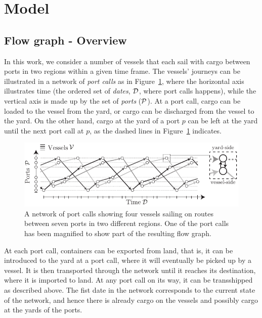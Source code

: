 \section{Model}
\subsection{Flow graph - Overview}

In this work, we consider a number of vessels that each sail with cargo between ports in two regions within a given time frame.  
The vessels' journeys can be illustrated in a network of \emph{port calls} as in Figure~\ref{fig:timespace}, where the horizontal axis illustrates time (the ordered set of \emph{dates}, $\mathcal{D}$, where port calls happens), while the vertical axis is made up by the set of \emph{ports} ($\mathcal{P}$). At a port call, cargo can be loaded to the vessel from the yard, or cargo can be discharged from the vessel to the yard. On the other hand, cargo at the yard of a port $p$ can be left at the yard until the next port call at $p$, as the dashed lines in Figure~\ref{fig:timespace} indicates. 

\begin{figure}[htbp]
	\centering
		\includegraphics[scale = 1.3]{netwBW.pdf}
		\caption{A network of port calls showing four vessels sailing on routes between seven ports in two different regions. One of the port calls has been magnified to show part of the resulting flow graph.}  \label{fig:timespace}
\end{figure}

At each port call, containers can be exported from land, that is, it can be introduced to the yard at a port call, where it will eventually be picked up by a vessel. It is then transported through the network until it reaches its destination, where it is imported to land. At any port call on its way, it can be transshipped as described above. 
The fist date in the network corresponds to the current state of the network, and hence there is already cargo on the vessels and possibly cargo at the yards of the ports.  


